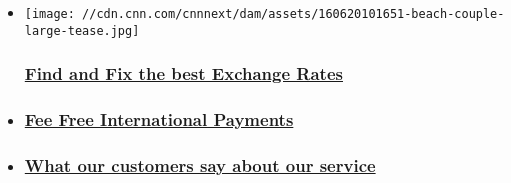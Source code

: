 \begin{itemize}
\item
  \href{https://www.cnnmoneytransfers.com/our-services/?utm_source=cnni\&utm_medium=Regions-PZ\&utm_campaign=Campaign2}{}

  \texttt{[image: //cdn.cnn.com/cnnnext/dam/assets/160620101651-beach-couple-large-tease.jpg]}

  \hypertarget{find-and-fix-the-best-exchange-rates}{%
  \subsubsection{\texorpdfstring{\href{https://www.cnnmoneytransfers.com/our-services/?utm_source=cnni\&utm_medium=Regions-PZ\&utm_campaign=Campaign2}{Find
  and Fix the best Exchange
  Rates}}{Find and Fix the best Exchange Rates}}\label{find-and-fix-the-best-exchange-rates}}
\item
  \hypertarget{fee-free-international-payments}{%
  \subsubsection{\texorpdfstring{\href{https://www.cnnmoneytransfers.com/?utm_source=cnni\&utm_medium=Regions-PZ\&utm_campaign=Campaign3}{Fee
  Free International
  Payments}}{Fee Free International Payments}}\label{fee-free-international-payments}}
\item
  \hypertarget{what-our-customers-say-about-our-service}{%
  \subsubsection{\texorpdfstring{\href{https://www.cnnmoneytransfers.com/customer-testimonials/?utm_source=cnni\&utm_medium=Regions-PZ\&utm_campaign=Campaign4}{What
  our customers say about our
  service}}{What our customers say about our service}}\label{what-our-customers-say-about-our-service}}
\end{itemize}

